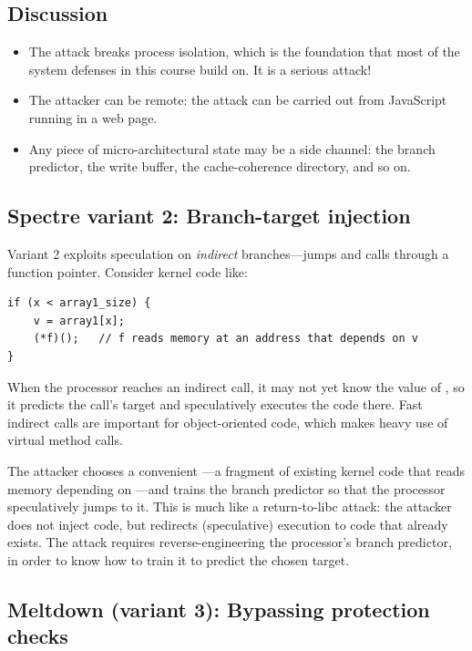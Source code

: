 \subsection{Discussion}
\begin{itemize}
  \item The attack breaks process isolation, which is the foundation that
        most of the system defenses in this course build on.
        It is a serious attack!
  \item The attacker can be remote: the attack can be carried out from
        JavaScript running in a web page.
  \item Any piece of micro-architectural state may be a side channel:
        the branch predictor, the write buffer, the cache-coherence
        directory, and so on.
\end{itemize}

\subsection{Spectre variant 2: Branch-target injection}

Variant 2 exploits speculation on \emph{indirect} branches---jumps and
calls through a function pointer.
Consider kernel code like:
\begin{lstlisting}
if (x < array1_size) {
    v = array1[x];
    (*f)();   // f reads memory at an address that depends on v
}
\end{lstlisting}
When the processor reaches an indirect call, it may not yet know the
value of , so it predicts the call's target and speculatively
executes the code there.
Fast indirect calls are important for object-oriented code, which makes
heavy use of virtual method calls.

The attacker chooses a convenient ---a fragment of existing kernel
code that reads memory depending on ---and trains the branch
predictor so that the processor speculatively jumps to it.
This is much like a return-to-libc attack: the attacker does not inject
code, but redirects (speculative) execution to code that already exists.
The attack requires reverse-engineering the processor's branch
predictor, in order to know how to train it to predict the chosen
target.

\subsection{Meltdown (variant 3): Bypassing protection checks}

